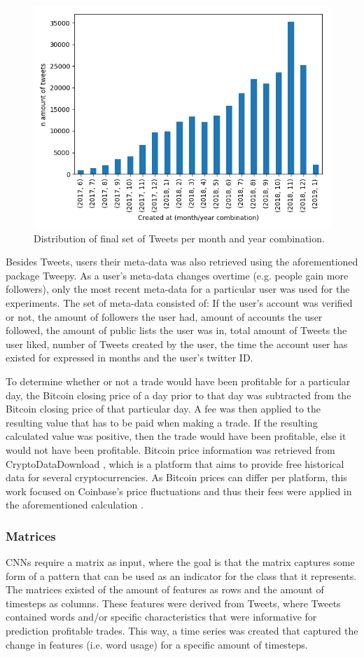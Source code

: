 \documentclass[sigconf]{acmart-txmm}
\begin{document}
\begin{figure}[H]
  \centering
  \includegraphics[width=0.75\linewidth]{report/img/distribution_tweets.png}
  \caption{Distribution of final set of Tweets per month and year combination.}
  \label{fig:dist_Tweets}
\end{figure}

Besides Tweets, users their meta-data was also retrieved using the aforementioned package Tweepy. As a user's meta-data changes overtime (e.g. people gain more followers), only the most recent meta-data for a particular user was used for the experiments. The set of meta-data consisted of: If the user's account was verified or not, the amount of followers the user had, amount of accounts the user followed, the amount of public lists the user was in, total amount of Tweets the user liked, number of Tweets created by the user, the time the account user has existed for expressed in months and the user's twitter ID.

To determine whether or not a trade would have been profitable for a particular day, the Bitcoin closing price of a day prior to that day was subtracted from the Bitcoin closing price of that particular day. A fee was then applied to the resulting value that has to be paid when making a trade. If the resulting calculated value was positive, then the trade would have been profitable, else it would not have been profitable. Bitcoin price information was retrieved from CryptoDataDownload \cite{cryptodatadownload}, which is a platform that aims to provide free historical data for several cryptocurrencies. As Bitcoin prices can differ per platform, this work focused on Coinbase's price fluctuations and thus their fees were applied in the aforementioned calculation \cite{coinbase_pro}.

\subsubsection{Matrices}
\label{sec:matrices}
CNNs require a matrix as input, where the goal is that the matrix captures some form of a pattern that can be used as an indicator for the class that it represents. The matrices existed of the amount of features as rows and the amount of timesteps as columns. These features were derived from Tweets, where Tweets contained words and/or specific characteristics that were informative for prediction profitable trades. This way, a time series was created that captured the change in features (i.e. word usage) for a specific amount of timesteps.
\end{document}
